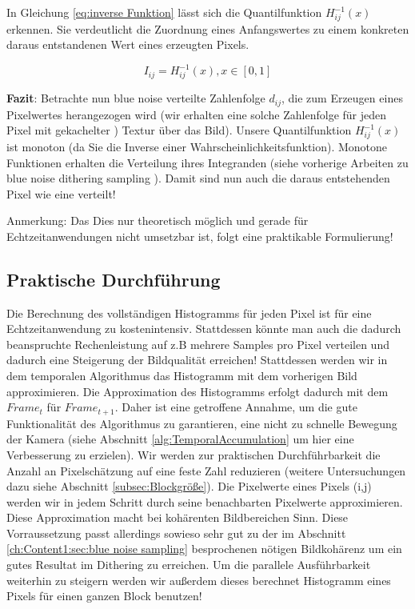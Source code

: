 In Gleichung \ref{eq:inverse Funktion} lässt sich die Quantilfunktion $H_{ij}^{-1}(x)$ erkennen. 
Sie verdeutlicht die Zuordnung eines Anfangswertes zu einem konkreten daraus entstandenen Wert 
eines erzeugten Pixels.

\begin{tcolorbox}[rightrule=3mm, rounded corners=east]
    \begin{equation}\label{eq:inverse Funktion}
        I_{ij} = H_{ij}^{-1}(x), x \in [0,1]
    \end{equation}
\end{tcolorbox}

\par

\textbf{Fazit}: Betrachte nun blue noise verteilte Zahlenfolge $d_{ij}$, die zum Erzeugen eines Pixelwertes herangezogen wird (wir erhalten eine solche 
Zahlenfolge für jeden Pixel mit gekachelter ) Textur über das Bild). Unsere Quantilfunktion 
$H_{ij}^{-1}(x)$ ist monoton (da Sie die Inverse einer Wahrscheinlichkeitsfunktion). Monotone Funktionen erhalten die Verteilung ihres
Integranden (siehe vorherige Arbeiten zu \glqq blue noise dithering sampling\grqq{} \cite[Seite 3]{hal02158423} \cite{georgiev2016blue}). 
Damit sind nun auch die daraus entstehenden Pixel wie eine  verteilt! 

Anmerkung: Das Dies nur theoretisch möglich und gerade für Echtzeitanwendungen nicht umsetzbar ist, 
folgt eine praktikable Formulierung!

\label{subsec:Praktische_Durchführung}
\subsection{Praktische Durchführung}

Die Berechnung des vollständigen Histogramms für jeden Pixel ist für eine Echtzeitanwendung zu kostenintensiv. Stattdessen könnte man auch die dadurch beanspruchte 
Rechenleistung auf z.B mehrere Samples pro Pixel verteilen und dadurch eine Steigerung der Bildqualität erreichen!
Stattdessen werden wir in dem temporalen Algorithmus das Histogramm mit dem vorherigen Bild approximieren. 
Die Approximation des Histogramms erfolgt dadurch mit dem $Frame_{t}$ für $Frame_{t+1}$. Daher ist eine getroffene Annahme, um die gute Funktionalität des 
Algorithmus zu garantieren, eine nicht zu schnelle Bewegung der Kamera (siehe Abschnitt \ref{alg:TemporalAccumulation} um hier eine Verbesserung zu erzielen).
Wir werden zur praktischen Durchführbarkeit die Anzahl an Pixelschätzung auf eine feste Zahl reduzieren (weitere Untersuchungen dazu siehe Abschnitt \ref{subsec:Blockgröße}).
Die Pixelwerte eines Pixels (i,j) werden wir in jedem Schritt durch seine benachbarten Pixelwerte approximieren. Diese Approximation macht bei kohärenten 
Bildbereichen Sinn. Diese Vorraussetzung passt allerdings sowieso sehr gut zu der im Abschnitt \ref{ch:Content1:sec:blue noise sampling} besprochenen nötigen 
Bildkohärenz um ein gutes Resultat im Dithering zu erreichen. Um die parallele Ausführbarkeit weiterhin zu steigern werden wir außerdem dieses 
berechnet Histogramm eines Pixels für einen ganzen Block benutzen!
\par

